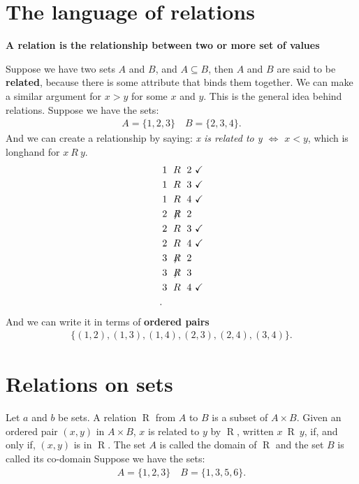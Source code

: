 \documentclass{report}
\begin{document}
    \section{\LARGE The language of relations}
    \smallbreak \noindent
    \begin{definition}
    \textbf{A \textbf{relation} is the relationship between two or more set of values} 
    \end{definition}
    \bigbreak \noindent 
    Suppose we have two sets $A$ and $B$, and $A \subseteq B$, then $A$ and $B$ are said to be \textbf{related}, because there is some attribute that binds them together. We can make a similar argument for $x>y$ for some $x$ and $y$. This is the general idea behind relations.
    \bigbreak \noindent 
    Suppose we have the sets:
    \begin{align*}
        A = \{1,2,3\} \quad B = \{2,3,4\}
    .\end{align*}
    \bigbreak \noindent 
    And we can create a relationship by saying: \textit{x is related to y $\iff$ $x<y$}, which is longhand for $x\ R\ y$. 
    \begin{align*}
        &1\ \mathrel{R}\ 2\ \checkmark \\
        &1\ \mathrel{R}\ 3\ \checkmark \\
        &1\ \mathrel{R}\ 4\ \checkmark \\
        &2\ \not \mathrel{R}\ 2 \\
        &2\ \mathrel{R}\ 3\ \checkmark\\
        &2\ \mathrel{R}\ 4\ \checkmark\\
        &3\ \not \mathrel{R}\ 2 \\
        &3\ \not \mathrel{R}\ 3 \\
        &3\ \mathrel{R}\ 4\ \checkmark\\
    .\end{align*}
    \bigbreak \noindent 
    And we can write it in terms of \textbf{ordered pairs}
    \begin{align*}
        \{(1,2),(1,3),(1,4),(2,3),(2,4),(3,4)\}
    .\end{align*}

    \pagebreak \bigbreak \noindent 
    \section{\LARGE Relations on sets}
    \bigbreak \noindent 
    Let $a$ and $b$ be sets. A relation $\mathrel{R}$ from $A$ to $B$ is a subset of $A \times B$. Given an ordered pair $(x,y)$ in $A\times B$, $x$ is related to $y$ by $\mathrel{R}$, written $x\ \mathrel{R}\ y$, if, and only if, $(x,y)$ is in $\mathrel{R}$. The set $A$ is called the domain of $\mathrel{R}$ and the set $B$ is called its co-domain
    \bigbreak \noindent 
    Suppose we have the sets:
    \begin{align*}
        A = \{1,2,3\} \quad B = \{1,3,5,6\}
    .\end{align*}
\end{document}
